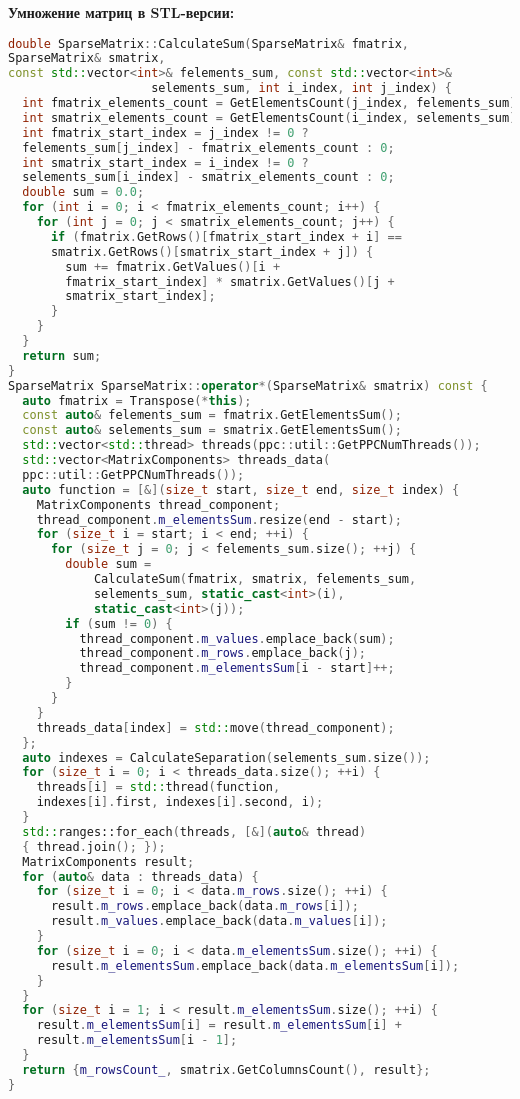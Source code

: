 \documentclass[12pt]{article}
\begin{document}
\textbf{Умножение матриц в STL-версии:}
\begin{lstlisting}[language=C++]
double SparseMatrix::CalculateSum(SparseMatrix& fmatrix, 
SparseMatrix& smatrix, 
const std::vector<int>& felements_sum, const std::vector<int>& 
                    selements_sum, int i_index, int j_index) {
  int fmatrix_elements_count = GetElementsCount(j_index, felements_sum);
  int smatrix_elements_count = GetElementsCount(i_index, selements_sum);
  int fmatrix_start_index = j_index != 0 ? 
  felements_sum[j_index] - fmatrix_elements_count : 0;
  int smatrix_start_index = i_index != 0 ? 
  selements_sum[i_index] - smatrix_elements_count : 0;
  double sum = 0.0;
  for (int i = 0; i < fmatrix_elements_count; i++) {
    for (int j = 0; j < smatrix_elements_count; j++) {
      if (fmatrix.GetRows()[fmatrix_start_index + i] == 
      smatrix.GetRows()[smatrix_start_index + j]) {
        sum += fmatrix.GetValues()[i + 
        fmatrix_start_index] * smatrix.GetValues()[j + 
        smatrix_start_index];
      }
    }
  }
  return sum;
}
SparseMatrix SparseMatrix::operator*(SparseMatrix& smatrix) const {
  auto fmatrix = Transpose(*this);
  const auto& felements_sum = fmatrix.GetElementsSum();
  const auto& selements_sum = smatrix.GetElementsSum();
  std::vector<std::thread> threads(ppc::util::GetPPCNumThreads());
  std::vector<MatrixComponents> threads_data(
  ppc::util::GetPPCNumThreads());
  auto function = [&](size_t start, size_t end, size_t index) {
    MatrixComponents thread_component;
    thread_component.m_elementsSum.resize(end - start);
    for (size_t i = start; i < end; ++i) {
      for (size_t j = 0; j < felements_sum.size(); ++j) {
        double sum =
            CalculateSum(fmatrix, smatrix, felements_sum, 
            selements_sum, static_cast<int>(i), 
            static_cast<int>(j));
        if (sum != 0) {
          thread_component.m_values.emplace_back(sum);
          thread_component.m_rows.emplace_back(j);
          thread_component.m_elementsSum[i - start]++;
        }
      }
    }
    threads_data[index] = std::move(thread_component);
  };
  auto indexes = CalculateSeparation(selements_sum.size());
  for (size_t i = 0; i < threads_data.size(); ++i) {
    threads[i] = std::thread(function, 
    indexes[i].first, indexes[i].second, i);
  }
  std::ranges::for_each(threads, [&](auto& thread) 
  { thread.join(); });
  MatrixComponents result;
  for (auto& data : threads_data) {
    for (size_t i = 0; i < data.m_rows.size(); ++i) {
      result.m_rows.emplace_back(data.m_rows[i]);
      result.m_values.emplace_back(data.m_values[i]);
    }
    for (size_t i = 0; i < data.m_elementsSum.size(); ++i) {
      result.m_elementsSum.emplace_back(data.m_elementsSum[i]);
    }
  }
  for (size_t i = 1; i < result.m_elementsSum.size(); ++i) {
    result.m_elementsSum[i] = result.m_elementsSum[i] +  
    result.m_elementsSum[i - 1];
  }
  return {m_rowsCount_, smatrix.GetColumnsCount(), result};
}
\end{lstlisting}
\end{document}
